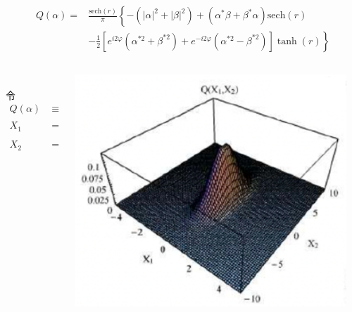     \begin{frame} 
    \frametitle{}
  \[\begin{aligned}
    Q(\alpha) = & \frac{\text{sech} (r)}{\pi} \left\{ -(\left|\alpha\right|^2 + \left|\beta\right|^2) + (\alpha^* \beta +\beta^* \alpha) \text{sech}(r) \right.\\ 
    & \left. -\frac{1}{2} \left[ e^{i 2 \varphi}( \alpha^{* 2} +\beta^{* 2})+ e^{-i 2 \varphi}( \alpha^{* 2} -\beta^{* 2}) \right] \tanh (r)\right\}
  \end{aligned} \]
    \begin{columns}
        \begin{column}[t]{0.46\linewidth}
        ~~\\
         令 
         \[\begin{aligned}
            Q(\alpha) & \equiv  Q(X_1,X_2) \\ 
            X_1 &= \frac{1}{2} (\alpha + \alpha^*) \\
            X_2 &= \frac{1}{2} (\alpha - \alpha^*) \\
          \end{aligned} \]
        \end{column}
        \begin{column}[t]{0.46\linewidth}
            \begin{center}
               \includegraphics[width=0.95\textwidth]{figs/22.png}
            \end{center}
        \end{column}
      \end{columns}
  \end{frame}

